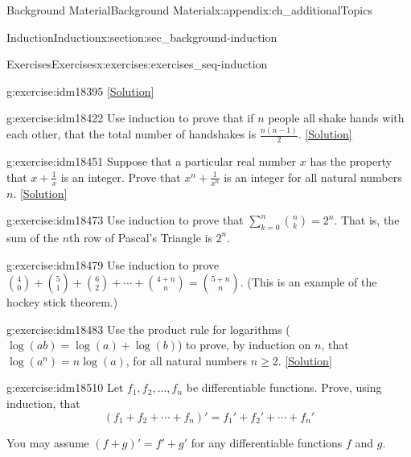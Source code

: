 \documentclass[oneside,10pt,]{book}
\numberwithin{equation}{chapter}
\def\d{\displaystyle}
\begin{document}
\begin{appendixptx}{Background Material}{}{Background Material}{}{}{x:appendix:ch_additionalTopics}
\begin{sectionptx}{Induction}{}{Induction}{}{}{x:section:sec_background-induction}
\begin{exercises-subsection}{Exercises}{}{Exercises}{}{}{x:exercises:exercises_seq-induction}
\begin{divisionexercise}{16}{}{}{g:exercise:idm18395}
\space\hspace*{0pt}\hfill{\tiny\hyperlink{g:solution:idm18403-main}{[Solution]}}\end{divisionexercise}%
\begin{divisionexercise}{17}{}{}{g:exercise:idm18422}%
Use induction to prove that if \(n\) people all shake hands with each other, that the total number of handshakes is \(\frac{n(n-1)}{2}\).%
\space\hspace*{0pt}\hfill{\tiny\hyperlink{g:solution:idm18427-main}{[Solution]}}\end{divisionexercise}%
\begin{divisionexercise}{18}{}{}{g:exercise:idm18451}%
Suppose that a particular real number \(x\) has the property that \(x + \frac{1}{x}\) is an integer. Prove that \(x^n + \frac{1}{x^n}\) is an integer for all natural numbers \(n\).%
\space\hspace*{0pt}\hfill{\tiny\hyperlink{g:solution:idm18458-main}{[Solution]}}\end{divisionexercise}%
\begin{divisionexercise}{19}{}{}{g:exercise:idm18473}%
Use induction to prove that \(\d\sum_{k=0}^n {n \choose k} = 2^n\). That is, the sum of the \(n\)th row of Pascal's Triangle is \(2^n\).%
\end{divisionexercise}%
\begin{divisionexercise}{20}{}{}{g:exercise:idm18479}%
Use induction to prove \({4 \choose 0} + {5 \choose 1} + {6 \choose 2} + \cdots + {4+n \choose n} = {5+n \choose n}\). (This is an example of the hockey stick theorem.)%
\end{divisionexercise}%
\begin{divisionexercise}{21}{}{}{g:exercise:idm18483}%
Use the product rule for logarithms (\(\log(ab) = \log(a) + \log(b)\)) to prove, by induction on \(n\), that \(\log(a^n) = n \log(a)\), for all natural numbers \(n \ge 2\).%
\space\hspace*{0pt}\hfill{\tiny\hyperlink{g:solution:idm18490-main}{[Solution]}}\end{divisionexercise}%
\begin{divisionexercise}{22}{}{}{g:exercise:idm18510}%
Let \(f_1, f_2,\ldots, f_n\) be differentiable functions. Prove, using induction, that%
\begin{equation*}
(f_1 + f_2 + \cdots + f_n)' = f_1' + f_2' + \cdots + f_n'
\end{equation*}
%
\par
You may assume \((f+g)' = f' + g'\) for any differentiable functions \(f\) and \(g\).%

\end{divisionexercise}
\end{exercises-subsection}
\end{sectionptx}
\end{appendixptx}
\end{document}
